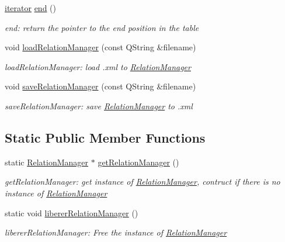 \begin{DoxyCompactItemize}
\hyperlink{class_relation_manager_1_1iterator}{iterator} \hyperlink{class_relation_manager_a9425308e362ee6921041d1e904785f19}{end} ()
\begin{DoxyCompactList}\small\item\em end\+: return the pointer to the end position in the table \end{DoxyCompactList}\item 
void \hyperlink{class_relation_manager_af587ffbf383d7fae096b0a2dba9ff679}{load\+Relation\+Manager} (const Q\+String \&filename)
\begin{DoxyCompactList}\small\item\em load\+Relation\+Manager\+: load .xml to \hyperlink{class_relation_manager}{Relation\+Manager} \end{DoxyCompactList}\item 
void \hyperlink{class_relation_manager_af12e8c983fdf15a3e84ec826c150fbea}{save\+Relation\+Manager} (const Q\+String \&filename)
\begin{DoxyCompactList}\small\item\em save\+Relation\+Manager\+: save \hyperlink{class_relation_manager}{Relation\+Manager} to .xml \end{DoxyCompactList}\end{DoxyCompactItemize}
\subsection*{Static Public Member Functions}
\begin{DoxyCompactItemize}
\item 
static \hyperlink{class_relation_manager}{Relation\+Manager} $\ast$ \hyperlink{class_relation_manager_a507b3edf840eb79a29f46662f3c30d04}{get\+Relation\+Manager} ()
\begin{DoxyCompactList}\small\item\em get\+Relation\+Manager\+: get instance of \hyperlink{class_relation_manager}{Relation\+Manager}, contruct if there is no instance of \hyperlink{class_relation_manager}{Relation\+Manager} \end{DoxyCompactList}\item 
\mbox{\label{class_relation_manager_a9ba5983117f98b5bb83bd41575f736b9}} 
static void \hyperlink{class_relation_manager_a9ba5983117f98b5bb83bd41575f736b9}{liberer\+Relation\+Manager} ()
\begin{DoxyCompactList}\small\item\em liberer\+Relation\+Manager\+: Free the instance of \hyperlink{class_relation_manager}{Relation\+Manager} \end{DoxyCompactList}\end{DoxyCompactItemize}


